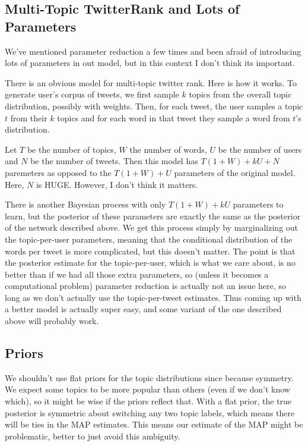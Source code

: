 \subsection{Multi-Topic TwitterRank and Lots of Parameters}

We've mentioned parameter reduction a few times and been afraid of introducing lots of parameters in out model, but in this context I don't think its important.  

There is an obvious model for multi-topic twitter rank.  Here is how it works.
To generate user's corpus of tweets, we first sample $k$ topics from the overall topic distribution, possibly with weights.  
Then, for each tweet, the user samples a topic $t$ from their $k$ topics and for each word in that tweet they sample a word from $t$'s distribution.

Let $T$ be the number of topics, $W$ the number of words, $U$ be the number of users and $N$ be the number of tweets.
Then this model has $T(1+W) + kU + N$ paremeters as opposed to the $T(1+W) + U$ parameters of the original model.
Here, $N$ is HUGE.  However, I don't think it matters.

There is another Bayesian process with only $T(1+W) + kU$ parameters to learn, but the posterior of these parameters are exactly the same as the posterior of the network described above.  We get this process simply by marginalizing out the topic-per-user parameters, meaning that the conditional distribution of the words per tweet is more complicated, but this doesn't matter.
The point is that the posterior estimate for the topic-per-user, which is what we care about, is no better than if we had all those extra parameters, so (unless it becomes a computational problem) parameter reduction is actually not an issue here, so long as we don't actually use the topic-per-tweet estimates.  Thus coming up with a better model is actually super easy, and some variant of the one described above will probably work.  

\subsection{Priors}

We shouldn't use flat priors for the topic distributions since because symmetry.
We expect some topics to be more popular than others (even if we don't know which), so it might be wise if the priors reflect that.
With a flat prior, the true posterior is symmetric about switching any two topic labels, which means there will be ties in the MAP estimates.
This means our estimate of the MAP might be problematic, better to just avoid this ambiguity.  
